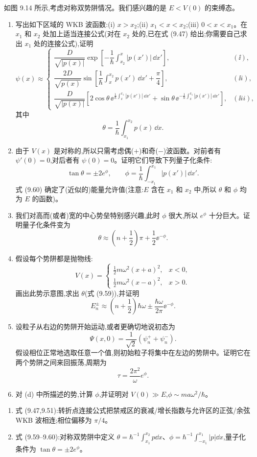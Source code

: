 \begin{question}
如图 9.14 所示,考虑对称双势阱情况。我们感兴趣的是 $E<V(0)$ 的束缚态。
\begin{enumerate}
\item 写出如下区域的 WKB 波函数:(i) $x>x_2$;(ii) $x_1<x<x_2$;(iii) $0<x<x_1$。在 $x_1$ 和 $x_2$ 处加上适当连接公式(对在 $x_2$ 处的,已在式 (9.47) 给出;你需要自己求出 $x_1$ 处的连接公式),证明
\[
\psi(x)\approx\begin{cases}
\dfrac{D}{\sqrt{|p(x)|}}\exp\left[-\dfrac{1}{\hbar}\int_{x_2}^{x}|p(x')|\,\dd x'\right], & (\ii),\\[1.2em]
\dfrac{2D}{\sqrt{p(x)}}\sin\left[\dfrac{1}{\hbar}\int_x^{x_2}p(x')\,\dd x'+\dfrac{\pi}{4}\right], & (\ii i),\\[1.2em]
\dfrac{D}{\sqrt{|p(x)|}}\left[2\cos\theta\,\ee^{\frac{1}{\hbar}\int_x^{x_1}|p(x')|\,\dd x'}+\sin\theta\,\ee^{-\frac{1}{\hbar}\int_x^{x_1}|p(x')|\,\dd x'}\right], & (\ii ii),
\end{cases}
\]
其中
\[
\theta=\frac{1}{\hbar}\int_{x_1}^{x_2}p(x)\,\dd x.
\]
\item 由于 $V(x)$ 是对称的,所以只需考虑偶($+$)和奇($-$)波函数。对前者有 $\psi'(0)=0$,对后者有 $\psi(0)=0$。证明它们导致下列量子化条件:
\[
\tan\theta=\pm2e^\phi,
\qquad
\phi=\frac{1}{\hbar}\int_{-x_1}^{x_1}|p(x')|\,\dd x'.
\]
式 (9.60) 确定了(近似的)能量允许值(注意:$E$ 含在 $x_1$ 和 $x_2$ 中,所以 $\theta$ 和 $\phi$ 均为 $E$ 的函数)。
\item 我们对高而(或者)宽的中心势垒特别感兴趣,此时 $\phi$ 很大,所以 $e^\phi$ 十分巨大。证明量子化条件变为
\[
\theta\approx \left(n+\frac12\right)\pi+\frac12\ee^{-\phi}.
\]
\item 假设每个势阱都是抛物线:
\[
V(x)=\begin{cases}
\frac12m\omega^2(x+a)^2, & x<0,\\
\frac12m\omega^2(x-a)^2, & x>0.
\end{cases}
\]
画出此势示意图,求出 $\theta$(式 (9.59)),并证明
\[
E_n^\pm\approx\left(n+\frac12\right)\hbar\omega\pm\frac{\hbar\omega}{2\pi}\ee^{-\phi}.
\]
\item 设粒子从右边的势阱开始运动,或者更确切地说初态为
\[
\Psi(x,0)=\frac{1}{\sqrt2}(\psi_n^++\psi_n^-).
\]
假设相位正常地选取任意一个值,则初始粒子将集中在左边的势阱中。证明它在两个势阱之间来回振荡,周期为
\[
\tau=\frac{2\pi^2}{\omega}e^\phi.
\]
\item 对 (d) 中所描述的势,计算 $\phi$,并证明对 $V(0)\gg E$,$\phi\sim ma\omega^2/\hbar$。
\end{enumerate}

\par\smallskip
{}
\begin{enumerate}[leftmargin=2.2em,itemsep=0.12em,topsep=0.12em,parsep=0pt]
\item 式 (9.47,9.51):转折点连接公式把禁戒区的衰减/增长指数与允许区的正弦/余弦 WKB 波相连;相位偏移为 $\pi/4$。
\item 式 (9.59--9.60):对称双势阱中定义 $\theta=\hbar^{-1}\int_{x_1}^{x_2}p\dd x$、$\phi=\hbar^{-1}\int_{-x_1}^{x_1}|p|\dd x$,量子化条件为 $\tan\theta=\pm2e^\phi$。
\end{enumerate}

\end{question}
